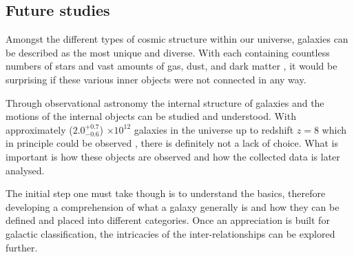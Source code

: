 \documentclass[12pt, twocolumn]{revtex4-1}    %
\begin{document}
\subsection{Future studies}
\noindent

Amongst the different types of cosmic structure within our universe, galaxies can be described as the most unique and diverse. With each containing countless numbers of stars and vast amounts of gas, dust, and dark matter \citep{carroll_astro}, it would be surprising if these various inner objects were not connected in any way.

Through observational astronomy the internal structure of galaxies and the motions of the internal objects can be studied and understood. With approximately ($2.0^{+0.7}_{-0.6}$) $\times 10^{12}$ galaxies in the universe up to redshift $z=8$ which in principle could be observed \citep{conselice_galaxynumber}, there is definitely not a lack of choice. What is important is how these objects are observed and how the collected data is later analysed. 




The initial step one must take though is to understand the basics, therefore developing a comprehension of what a galaxy generally is and how they can be defined and placed into different categories. Once an appreciation is built for galactic classification, the intricacies of the inter-relationships can be explored further. 


\end{document}
